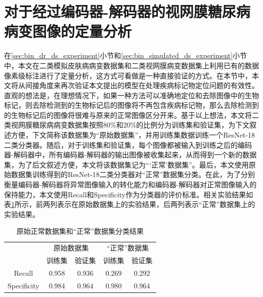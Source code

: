 \section{对于经过编码器-解码器的视网膜糖尿病病变图像的定量分析}\label{sec:indirect_quantitative_evaluation}
在\ref{sec:bin_dr_ds_experiment}小节和\ref{sec:bin_simulated_ds_experiment}小节中，本文在二类模拟皮肤病病变数据集和二类视网膜病变数据集上利用已有的数据像素级标注进行了定量分析，这方式可看做是一种直接验证的方式。在本节中，本文将从间接角度来再次验证本文提出的模型在处理疾病标记物定位问题的有效性。直观的想法是，在理想情况下，如果一种方法可以准确地定位和去除图像中的生物标记，则去除检测到的生物标记后的图像将不再包含疾病标记物，那么去除检测到的生物标记后的图像将很难与原来的正常图像区分开来。基于以上想法，本文将二类视网膜糖尿病病变数据集按照$80$\%和$20$\%的比例分为训练集和验证集，为下文叙述方便，下文简称该数据集为“原始数据集”，并用训练集数据训练一个ResNet-18二类分类器。随后，对于训练集和验证集，每个图像都被输入到训练之后的编码器-解码器中，所有编码器-解码器的输出图像被收集起来，从而得到一个新的数据集，为了后文叙述方便，本文将该数据集记为“‘正常’数据集”。最后，本文使用原始数据集训练得到的ResNet-18二类分类器对“正常”数据集分类。在此，为了分别衡量编码器-解码器将异常图像输入的转化能力和编码器-解码器对正常图像输入的保持能力，本文使用Recall和Specificity作为分类器的评价标准。相关实验结果如表\ref{tab:quantitative_retinal}所示，前两列表示在原始数据集上的实验结果，后两列表示“正常”数据集上的实验结果。

\begin{table}[h!]
	\begin{center}
		\caption{原始正常数据集和“正常”数据集分类结果} 
		\label{tab:quantitative_retinal}
		\begin{tabular}{c|cc|cc}
			\toprule[2pt]
			& \multicolumn{2}{c|}{原始数据集} & \multicolumn{2}{c}{“正常”数据集} \\
			&  训练集 & 验证集 & 训练集 & 验证集\\
			\midrule[2pt]
			Recall & $0.958$ & $0.936$ & $0.269$ & $0.292$\\ \hline
			Specificity & $0.984$ & $0.964$ & $0.980$ & $0.964$\\
			\bottomrule[2pt]
		\end{tabular} 
	\end{center}
\end{table}

